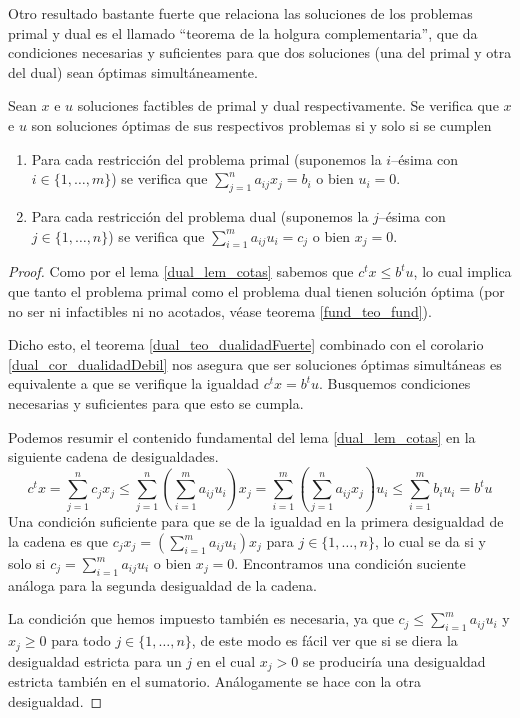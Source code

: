 Otro resultado bastante fuerte que relaciona las soluciones de los problemas primal y dual es el llamado ``teorema de la holgura complementaria'', que da condiciones necesarias y suficientes para que dos soluciones (una del primal y otra del dual) sean óptimas simultáneamente.
\begin{theo}
	\label{dual_teo_holgura}
	Sean $x$ e $u$ soluciones factibles de primal y dual respectivamente. Se verifica que $x$ e $u$ son soluciones óptimas de sus respectivos problemas si y solo si se cumplen
	\begin{enumerate}
		\item Para cada restricción del problema primal (suponemos la $i$--ésima con $i\in\{1,\dots,m\}$) se verifica que $\sum_{j=1}^{n}a_{ij}x_j=b_i$ o bien $u_i=0$.
		\item Para cada restricción del problema dual (suponemos la $j$--ésima con $j\in\{1,\dots,n\}$) se verifica que $\sum_{i=1}^{m}a_{ij}u_i=c_j$ o bien $x_j=0$.
	\end{enumerate}
\end{theo}
\begin{proof}
	Como por el lema \ref{dual_lem_cotas} sabemos que $c^tx\leq b^tu$, lo cual implica que tanto el problema primal como el problema dual tienen solución óptima (por no ser ni infactibles ni no acotados, véase teorema \ref{fund_teo_fund}).
	
	Dicho esto, el teorema \ref{dual_teo_dualidadFuerte} combinado con el corolario \ref{dual_cor_dualidadDebil} nos asegura que ser soluciones óptimas simultáneas es equivalente a que se verifique la igualdad $c^tx=b^tu$. Busquemos condiciones necesarias y suficientes para que esto se cumpla.
	
	Podemos resumir el contenido fundamental del lema \ref{dual_lem_cotas} en la siguiente cadena de desigualdades.
	\begin{equation*}
		c^tx=\sum_{j=1}^{n}c_jx_j\leq \sum_{j=1}^{n}\left(\sum_{i=1}^{m}a_{ij}u_i\right)x_j=\sum_{i=1}^{m}\left(\sum_{j=1}^{n}a_{ij}x_j\right)u_i\leq \sum_{i=1}^{m}b_iu_i=b^tu
	\end{equation*}
	Una condición suficiente para que se de la igualdad en la primera desigualdad de la cadena es que $c_jx_j=(\sum_{i=1}^{m}a_{ij}u_i)x_j$ para $j\in\{1,\dots,n\}$, lo cual se da si y solo si $c_j=\sum_{i=1}^{m}a_{ij}u_i$ o bien $x_j=0$. Encontramos una condición suciente análoga para la segunda desigualdad de la cadena.
	
	La condición que hemos impuesto también es necesaria, ya que $c_j\leq\sum_{i=1}^{m}a_{ij}u_i$ y $x_j\geq 0$ para todo $j\in\{1,\dots,n\}$, de este modo es fácil ver que si se diera la desigualdad estricta para un $j$ en el cual $x_j>0$ se produciría una desigualdad estricta también en el sumatorio. Análogamente se hace con la otra desigualdad.
\end{proof}
